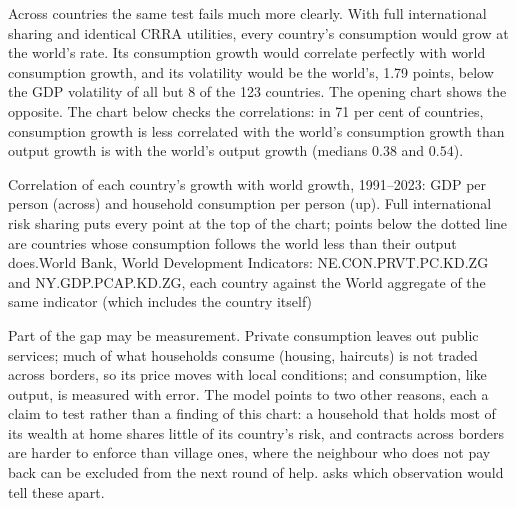 Across countries the same test fails much more clearly. With full international sharing and identical
CRRA utilities, every country's consumption would grow at the world's rate. Its consumption growth
would correlate perfectly with world consumption growth, and its volatility would be the world's,
1.79 points, below the GDP volatility of all but 8 of the 123 countries. The opening chart shows the
opposite. The chart below checks the correlations: in 71 per cent of countries, consumption growth is
less correlated with the world's consumption growth than output growth is with the world's output
growth (medians $0.38$ and $0.54$).

\begin{omchart}{Correlation of each country's growth with world growth, 1991--2023: GDP per person
  (across) and household consumption per person (up). Full international risk sharing puts every point
  at the top of the chart; points below the dotted line are countries whose consumption follows the
  world less than their output does.}{World Bank, World Development Indicators: NE.CON.PRVT.PC.KD.ZG
  and NY.GDP.PCAP.KD.ZG, each country against the World aggregate of the same indicator (which
  includes the country itself)}
\end{omchart}

Part of the gap may be measurement. Private consumption leaves out public services; much of what
households consume (housing, haircuts) is not traded across borders, so its price moves with local
conditions; and consumption, like output, is measured with error. The model points to two other
reasons, each a claim to test rather than a finding of this chart: a household that holds most of its
wealth at home shares little of its country's risk, and contracts across borders are harder to enforce
than village ones, where the neighbour who does not pay back can be excluded from the next round of
help.  asks which observation would tell these apart.

